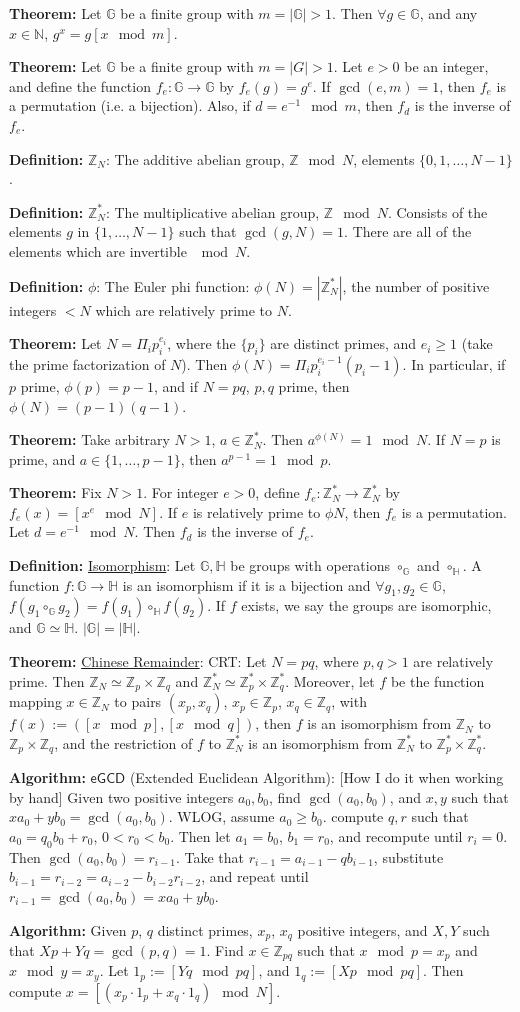 \documentclass[10pt]{article}
\newcommand{\Z}{\mathbb{Z}}
\newcommand{\N}{\mathbb{N}}
\newcommand{\G}{\mathbb{G}}
\newcommand{\HH}{\mathbb{H}}
\newcommand{\defn}[1]{{\bf Definition:} \underline{#1}}
\newcommand{\thm}[1]{{\bf Theorem:} \underline{#1}}
\newcommand{\alg}[1]{{\bf Algorithm:} \underline{#1}}
\begin{document}
\begin{multicols}{4}
\thm{}Let $\G$ be a finite group with $m=|\G|>1$. Then $\forall g\in\G$, and any $x\in\N$, $g^{x}=g{[x\mod{m}]}$.

\thm{}Let $\G$ be a finite group with $m=|G|>1$. Let $e>0$ be an integer, and define the function $f_e:\G\to\G$ by $f_e(g)=g^e$. If $\gcd(e,m)=1$, then $f_e$ is a permutation (i.e. a bijection). Also, if $d=e^{-1}\mod{m}$, then $f_d$ is the inverse of $f_e$.

\defn{$\Z_N$}: The additive abelian group, $\Z\mod{N}$, elements $\{0,1,\dots,N-1\}$. 

\defn{$\Z_N^*$}: The multiplicative abelian group, $\Z\mod{N}$. Consists of the elements $g$ in $\{1,\dots,N-1\}$ such that $\gcd(g,N)=1$. There are all of the elements which are invertible $\mod{N}$.

\defn{$\phi$}: The Euler phi function: $\phi(N)=|\Z_N^*|$, the number of positive integers $<N$ which are relatively prime to $N$.

\thm{}Let $N=\Pi_ip_i^{e_i}$, where the $\{p_i\}$ are distinct primes, and $e_i\geq 1$ (take the prime factorization of $N$). Then $\phi(N)=\Pi_ip_i^{e_i-1}(p_i-1)$. In particular, if $p$ prime, $\phi(p)=p-1$, and if $N=pq$, $p,q$ prime, then $\phi(N)=(p-1)(q-1)$.

\thm{}Take arbitrary $N>1$, $a\in\Z_N^*$. Then $a^{\phi(N)}=1\mod{N}$. If $N=p$ is prime, and $a\in\{1,\dots,p-1\}$, then $a^{p-1}=1\mod{p}$.

\thm{}Fix $N>1$. For integer $e>0$, define $f_e:\Z_N^*\to\Z_N^*$ by $f_e(x)=[x^e\mod{N}]$. If $e$ is relatively prime to $\phi{N}$, then $f_e$ is a permutation. Let $d=e^{-1}\mod{N}$. Then $f_d$ is the inverse of $f_e$.

\defn{Isomorphism}: Let $\G,\HH$ be groups with operations $\circ_\G$ and $\circ_\HH$. A function $f:\G\to\HH$ is an isomorphism if it is a bijection and $\forall g_1,g_2\in\G$, $f(g_1\circ_\G g_2)=f(g_1)\circ_\HH f(g_2)$. If $f$ exists, we say the groups are isomorphic, and $\G\simeq\HH$. $|\G|=|\HH|$.

\thm{Chinese Remainder}: CRT: Let $N=pq$, where $p,q>1$ are relatively prime. Then $\Z_N\simeq\Z_p\times\Z_q$ and $\Z_N^*\simeq\Z_p^*\times\Z_q^*$. Moreover, let $f$ be the function mapping $x\in\Z_N$ to pairs $(x_p,x_q)$, $x_p\in\Z_p$, $x_q\in\Z_q$, with $f(x):=([x\mod{p}],[x\mod{q}])$, then $f$ is an isomorphism from $\Z_N$ to $\Z_p\times\Z_q$, and the restriction of $f$ to $\Z_N^*$ is an isomorphism from $\Z_N^*$ to $\Z_p^*\times\Z_q^*$.

\alg{$\mathsf{eGCD}$} (Extended Euclidean Algorithm): [How I do it when working by hand] Given two positive integers $a_0,b_0$, find $\gcd(a_0,b_0)$, and $x,y$ such that $xa_0+yb_0=\gcd(a_0,b_0)$. WLOG, assume $a_0\geq b_0$. compute $q,r$ such that $a_0=q_0b_0+r_0$, $0<r_0<b_0$. Then let $a_1=b_0$, $b_1=r_0$, and recompute until $r_i=0$. Then $\gcd(a_0,b_0)=r_{i-1}$. Take that $r_{i-1}=a_{i-1}-qb_{i-1}$, substitute $b_{i-1}=r_{i-2}=a_{i-2}-b_{i-2}r_{i-2}$, and repeat until $r_{i-1}=\gcd(a_0,b_0)=xa_0+yb_0$.

\alg{}Given $p$, $q$ distinct primes, $x_p$, $x_q$ positive integers, and $X,Y$ such that $Xp+Yq=\gcd(p,q)=1$. Find $x\in\Z_{pq}$ such that $x\mod{p}=x_p$ and $x\mod{y}=x_y$. Let $1_p:=[Yq\mod{pq}]$, and $1_q:=[Xp\mod{pq}]$. Then compute $x=[(x_p\cdot 1_p+x_q\cdot 1_q)\mod{N}]$.

\end{multicols}
\end{document}
